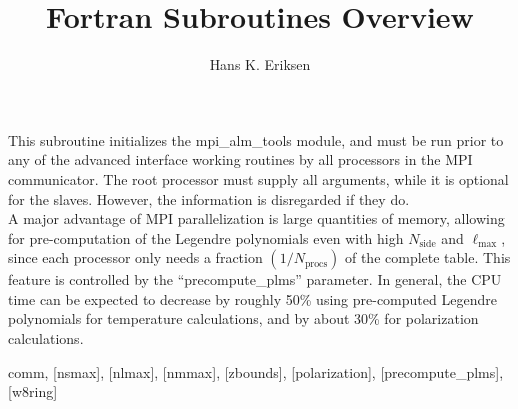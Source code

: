 
\sloppy


\title{\healpix Fortran Subroutines Overview}
 \section[mpi\_initialize\_alm\_tools]{ }
\label{sub:mpi_initialize_alm_tools}
\author{Hans K. Eriksen}

\begin{facility}
{This subroutine initializes the mpi\_alm\_tools module, and must be
run prior to any of the advanced interface working routines by all
processors in the MPI communicator. The root processor must supply all arguments, 
while it is optional for the slaves. However, the information is disregarded 
if they do.\\
A major advantage of MPI parallelization is large quantities
of memory, allowing for pre-computation of the Legendre 
polynomials even with high $N_{\textrm{side}}$ and
$\ell_{\textrm{max}}$, since each processor only needs a fraction
$(1/N_{\textrm{procs}})$ of the complete table. This feature is
controlled by the ``precompute\_plms'' parameter. In general, the CPU
time can be expected to decrease by roughly 50\% using pre-computed
Legendre polynomials for temperature calculations, and by about 30\%
for polarization calculations.
}
{\modMpiAlmTools}
\end{facility}

\begin{f90format}
{comm, [nsmax], [nlmax], [nmmax], [zbounds], [polarization], [precompute\_plms], [w8ring]}
\end{f90format}

